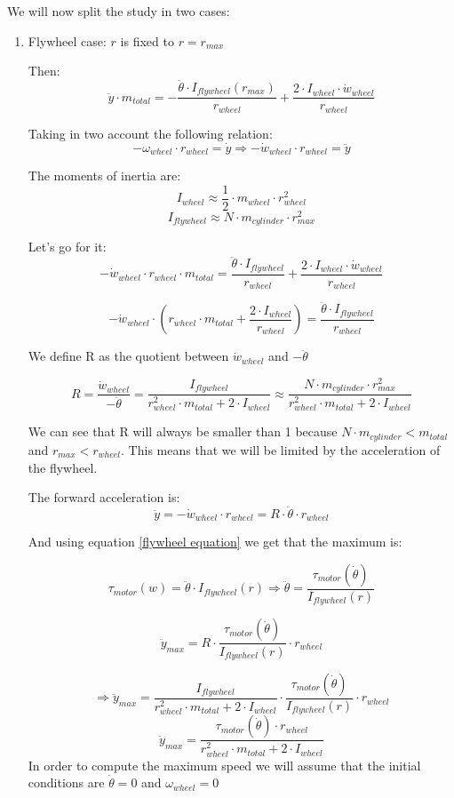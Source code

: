 We will now split the study in two cases:
\begin{enumerate}
    \item Flywheel case: $r$ is fixed to $r = r_{max}$ 
    
    Then:  
    \[\ddot{y}\cdot m_{total} = - \frac{\ddot{\theta}\cdot I_{flywheel}(r_{max})}
    {r_{wheel}} + \frac{2\cdot I_{wheel} \cdot  \dot{w}_{wheel}}{r_{wheel}}\]

    Taking in two account the following relation:
    \[-\omega_{wheel} \cdot  r_{wheel} = \dot{y} \Rightarrow  -\dot{w}_{wheel} \cdot  r_{wheel} = \ddot{y} \]

    The moments of inertia are:
    \[I_{wheel} \approx \frac{1}{2} \cdot m_{wheel} \cdot  r_{wheel}^2\]
    \[I_{flywheel} \approx N \cdot  m_{cylinder} \cdot  r_{max}^2\]

    Let's go for it:
    \[-\dot{w}_{wheel} \cdot  r_{wheel}\cdot m_{total} = \frac{\ddot{\theta}\cdot I_{flywheel}}
    {r_{wheel}} + \frac{2\cdot I_{wheel} \cdot  \dot{w}_{wheel}}{r_{wheel}} \]

    \[-\dot{w}_{wheel} \cdot (r_{wheel}\cdot m_{total} +  \frac{2\cdot I_{wheel} }{r_{wheel}}) = 
    \frac{\ddot{\theta}\cdot I_{flywheel}}{r_{wheel}}\]


    We define R as the quotient between $\dot{w}_{wheel}$ and $-\ddot{\theta}$

    \[R = \frac{\dot{w}_{wheel}}{-\ddot{\theta}} = 
    \frac{I_{flywheel}}
    {r_{wheel}^2\cdot m_{total} +  2\cdot I_{wheel}} \approx
    \frac{ N \cdot  m_{cylinder} \cdot  r_{max}^2}
    {r_{wheel}^2\cdot m_{total} +  2\cdot I_{wheel}} \] 

    We can see that R will always be smaller than 1 because $N \cdot  m_{cylinder} < m_{total} $ and $r_{max} < r_{wheel}$. This means that we will be limited by the acceleration of the flywheel.

    The forward acceleration is:
    \[\ddot{y} = -\dot{w}_{wheel} \cdot  r_{wheel} = R \cdot  \ddot{\theta} \cdot  r_{wheel}\]

    And using equation \ref{flywheel equation} we get that the maximum is:

    \[\tau_{motor} (w) = \ddot{\theta}\cdot I_{flywheel}(r) \Rightarrow \ddot{\theta} = \frac{\tau_{motor} (\dot{\theta})}{I_{flywheel}(r)} \]

    \[\ddot{y}_{max} = R \cdot  \frac{\tau_{motor} (\dot{\theta})}{I_{flywheel}(r)} \cdot  r_{wheel}\]

    \[\Rightarrow \ddot{y}_{max} =     \frac{I_{flywheel}}
    {r_{wheel}^2\cdot m_{total} +  2\cdot I_{wheel}}  \cdot  \frac{\tau_{motor} (\dot{\theta})}{I_{flywheel}(r)} \cdot  r_{wheel}\]
    \begin{equation}        
        \boxed{\ddot{y}_{max} = \frac{\tau_{motor}(\dot{\theta})\cdot r_{wheel} }
        {r_{wheel}^2\cdot m_{total} +  2\cdot I_{wheel}}}
        \label{maximum acceleration flywheel}
    \end{equation}
    In order to compute the maximum speed we will assume that the initial conditions are $\dot{\theta} = 0$ and 
    $\omega_{wheel}=0$


\end{enumerate}
